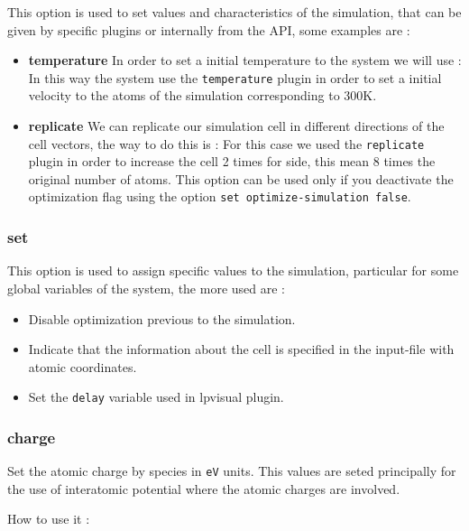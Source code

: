 This option is used to set values and characteristics of the simulation, that
can be given by specific plugins or internally from the API, some examples are :

\begin{itemize}
 \item \textbf{temperature}
In order to set a initial temperature to the system we will use :
In this way the system use the \verb|temperature| plugin in order to set a
initial velocity to the atoms of the simulation corresponding to 300K.
 \item \textbf{replicate}
We can replicate our simulation cell in different directions of the cell
vectors, the way to do this is :
For this case we used the \verb|replicate| plugin in order to increase the cell
2 times for side, this mean 8 times the original number of atoms. This option
can be used only if you deactivate the optimization flag using the
option \verb|set optimize-simulation false|.
\end{itemize}

\subsubsection{set}

This option is used to assign specific values to the simulation, particular for
some global variables of the system, the more used are :

\begin{itemize}
 \item Disable optimization previous to the simulation.
 \item Indicate that the information about the cell is specified in the
input-file with atomic coordinates.
 \item Set the \texttt{delay} variable used in lpvisual plugin.
\end{itemize}

\subsubsection{charge}

Set the atomic charge by species in \verb|eV| units. This values are seted
principally for the use of interatomic potential where the atomic charges are
involved.

How to use it :

